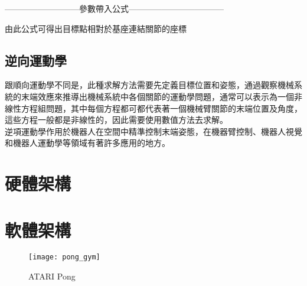 ---------------------------參數帶入公式-----------------------------------


由此公式可得出目標點相對於基座連結關節的座標\\

\subsection{逆向運動學}
跟順向運動學不同是，此種求解方法需要先定義目標位置和姿態，通過觀察機械系統的末端效應來推導出機械系統中各個關節的運動學問題，通常可以表示為一個非線性方程組問題，其中每個方程都可都代表著一個機械臂關節的末端位置及角度，這些方程一般都是非線性的，因此需要使用數值方法去求解。\\
逆項運動學作用於機器人在空間中精準控制末端姿態，在機器臂控制、機器人視覺和機器人運動學等領域有著許多應用的地方。\\

\section{硬體架構}
 
 \section{軟體架構}
\begin{figure}[hbt!]
\begin{center}
\texttt{[image: pong\_gym]}
\caption{\Large ATARI Pong}\label{fig.pong}
\end{center}
\end{figure} 

\newpage
